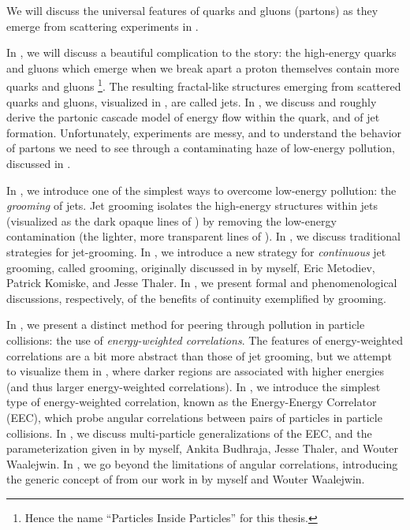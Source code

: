 We will discuss the universal features of quarks and gluons (partons) as they emerge from scattering experiments in .



In , we will discuss a beautiful complication to the story:
%
the high-energy quarks and gluons which emerge when we break apart a proton themselves contain more quarks and gluons%
\footnote{
    Hence the name ``Particles Inside Particles'' for this thesis.
}.
%
The resulting fractal-like structures emerging from scattered quarks and gluons, visualized in , are called \glspl{jet}.
%
In , we discuss and roughly derive the partonic cascade model of energy flow within the quark, and of jet formation.
%
Unfortunately, experiments are messy, and to understand the behavior of partons we need to see through a contaminating haze of low-energy pollution, discussed in .



In , we introduce one of the simplest ways to overcome low-energy pollution:
%
the \textit{grooming} of jets.
%
Jet grooming isolates the high-energy structures within jets (visualized as the dark opaque lines of ) by removing the low-energy contamination (the lighter, more transparent lines of ).
%
In , we discuss traditional strategies for \gls{jet-grooming}.
%
In , we introduce a new strategy for \textit{continuous} jet grooming, called \PIRANHA{} grooming, originally discussed in  by myself, Eric Metodiev, Patrick Komiske, and Jesse Thaler.
%
In , we present formal and phenomenological discussions, respectively, of the benefits of continuity exemplified by \PIRANHA{} grooming.




In , we present a distinct method for peering through pollution in particle collisions:
%
the use of \textit{energy-weighted correlations}.
%
The features of energy-weighted correlations are a bit more abstract than those of jet grooming, but we attempt to visualize them in , where darker regions are associated with higher energies (and thus larger energy-weighted correlations).
%
In , we introduce the simplest type of energy-weighted correlation, known as the Energy-Energy Correlator (EEC), which probe angular correlations between pairs of particles in particle collisions.
%
In , we discuss multi-particle generalizations of the EEC, and the parameterization given in  by myself, Ankita Budhraja, Jesse Thaler, and Wouter Waalejwin.
%
In , we go beyond the limitations of angular correlations, introducing the generic concept of  from our work in  by myself and Wouter Waalejwin.


